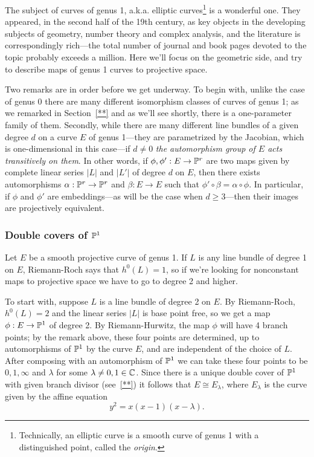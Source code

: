 The subject of curves of genus 1, a.k.a. elliptic curves\footnote{Technically, an elliptic curve is a smooth curve of genus 1 with a distinguished point, called the \emph{origin}.} is a wonderful one. They appeared, in the second half of the 19th century, as key objects in the developing subjects of geometry, number theory and complex analysis, and the literature is correspondingly rich---the total number of journal and book pages devoted to the topic probably exceeds a million. Here we'll focus on the geometric side, and try to describe maps of genus 1 curves to projective space.

Two remarks are in order before we get underway. To begin with, unlike the case of genus 0 there are many different isomorphism classes of curves of genus 1; as we remarked in Section~\ref{**} and as we'll see shortly, there is a one-parameter family of them. Secondly, while there are many different line bundles of a given degree $d$ on a curve $E$ of genus 1---they are parametrized by the Jacobian, which is one-dimensional in this case---if $d \neq 0$ \emph{the automorphism group of $E$ acts transitively on them}. In other words, if $\phi, \phi' : E \to {\mathbb P}^r$ are two maps given by complete linear series $|L|$ and $|L'|$ of degree $d$ on $E$, then there exists  automorphisms $\alpha : {\mathbb P}^r \to {\mathbb P}^r$ and $\beta : E \to E$ such that $\phi' \circ \beta= \alpha \circ \phi$. In particular, if $\phi$ and $\phi'$ are embeddings---as will be the case when $d \geq 3$---then their images are projectively equivalent.

\subsubsection{Double covers of ${\mathbb P}^1$}

Let $E$ be a smooth projective curve of genus 1. If $L$ is any line bundle of degree 1 on $E$, Riemann-Roch says that $h^0(L) = 1$, so if we're looking for nonconstant maps to projective space we have to go to degree 2 and higher.

To start with, suppose $L$ is a line bundle of degree 2 on $E$. By Riemann-Roch, $h^0(L) = 2$ and the linear series $|L|$ is base point free, so we get a map $\phi : E \to {\mathbb P}^1$ of degree 2. By Riemann-Hurwitz, the map $\phi$ will have 4 branch points; by the remark above, these four points are determined, up to automorphisms of ${\mathbb P}^1$ by the curve $E$, and are independent of the choice of $L$.
After composing with an automorphism of ${\mathbb P}^1$ we can take these four points to be $0, 1, \infty$ and $\lambda$ for some $\lambda \neq 0, 1 \in {\mathbb C}$. Since there is a unique double cover of ${\mathbb P}^1$ with given branch divisor (see~\ref{**}) it follows that $E \cong E_\lambda$, where $E_\lambda$ is the curve given by the affine equation
$$
y^2 = x(x-1)(x-\lambda).
$$

